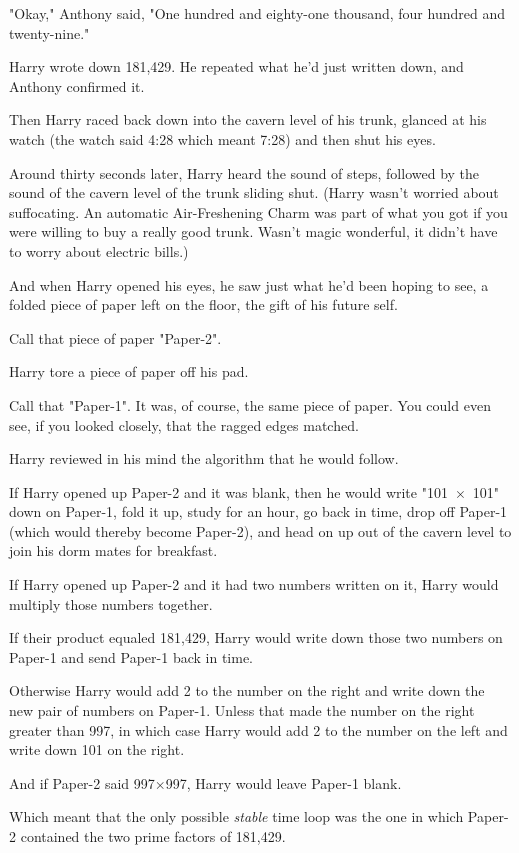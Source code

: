 "Okay," Anthony said, "One hundred and eighty-one thousand, four hundred and 
twenty-nine."

Harry wrote down 181,429. He repeated what he'd just written down, and Anthony 
confirmed it.

Then Harry raced back down into the cavern level of his trunk, glanced at his 
watch (the watch said 4:28 which meant 7:28) and then shut his eyes.

Around thirty seconds later, Harry heard the sound of steps, followed by the 
sound of the cavern level of the trunk sliding shut. (Harry wasn't worried 
about suffocating. An automatic Air-Freshening Charm was part of what you got 
if you were willing to buy a really good trunk. Wasn't magic wonderful, it 
didn't have to worry about electric bills.)

And when Harry opened his eyes, he saw just what he'd been hoping to see, a 
folded piece of paper left on the floor, the gift of his future self.

Call that piece of paper "Paper-{2}".

Harry tore a piece of paper off his pad.

Call that "Paper-{1}". It was, of course, the same piece of paper. You could even 
see, if you looked closely, that the ragged edges matched.

Harry reviewed in his mind the algorithm that he would follow.

If Harry opened up Paper-{2} and it was blank, then he would write "101~$\times$~101" 
down on Paper-{1}, fold it up, study for an hour, go back in time, drop off 
Paper-{1} (which would thereby become Paper-{2}), and head on up out of the cavern 
level to join his dorm mates for breakfast.

If Harry opened up Paper-{2} and it had two numbers written on it, Harry would 
multiply those numbers together.

If their product equaled 181,429, Harry would write down those two numbers on 
Paper-{1} and send Paper-{1} back in time.

Otherwise Harry would add 2 to the number on the right and write down the new 
pair of numbers on Paper-{1}. Unless that made the number on the right greater 
than 997, in which case Harry would add 2 to the number on the left and write 
down 101 on the right.

And if Paper-{2} said 997$\times$997, Harry would leave Paper-{1} blank.

Which meant that the only possible \emph{stable} time loop was the one in which 
Paper-{2} contained the two prime factors of 181,429.

